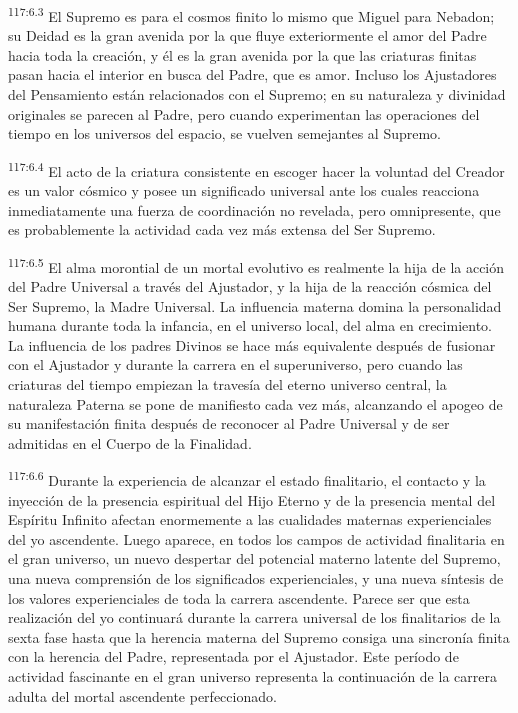 \par
\textsuperscript{117:6.3} El Supremo es para el cosmos finito lo mismo que Miguel para Nebadon; su Deidad es la gran avenida por la que fluye exteriormente el amor del Padre hacia toda la creación, y él es la gran avenida por la que las criaturas finitas pasan hacia el interior en busca del Padre, que es amor. Incluso los Ajustadores del Pensamiento están relacionados con el Supremo; en su naturaleza y divinidad originales se parecen al Padre, pero cuando experimentan las operaciones del tiempo en los universos del espacio, se vuelven semejantes al Supremo.

\par
\textsuperscript{117:6.4} El acto de la criatura consistente en escoger hacer la voluntad del Creador es un valor cósmico y posee un significado universal ante los cuales reacciona inmediatamente una fuerza de coordinación no revelada, pero omnipresente, que es probablemente la actividad cada vez más extensa del Ser Supremo.

\par
\textsuperscript{117:6.5} El alma morontial de un mortal evolutivo es realmente la hija de la acción del Padre Universal a través del Ajustador, y la hija de la reacción cósmica del Ser Supremo, la Madre Universal. La influencia materna domina la personalidad humana durante toda la infancia, en el universo local, del alma en crecimiento. La influencia de los padres Divinos se hace más equivalente después de fusionar con el Ajustador y durante la carrera en el superuniverso, pero cuando las criaturas del tiempo empiezan la travesía del eterno universo central, la naturaleza Paterna se pone de manifiesto cada vez más, alcanzando el apogeo de su manifestación finita después de reconocer al Padre Universal y de ser admitidas en el Cuerpo de la Finalidad.

\par
\textsuperscript{117:6.6} Durante la experiencia de alcanzar el estado finalitario, el contacto y la inyección de la presencia espiritual del Hijo Eterno y de la presencia mental del Espíritu Infinito afectan enormemente a las cualidades maternas experienciales del yo ascendente. Luego aparece, en todos los campos de actividad finalitaria en el gran universo, un nuevo despertar del potencial materno latente del Supremo, una nueva comprensión de los significados experienciales, y una nueva síntesis de los valores experienciales de toda la carrera ascendente. Parece ser que esta realización del yo continuará durante la carrera universal de los finalitarios de la sexta fase hasta que la herencia materna del Supremo consiga una sincronía finita con la herencia del Padre, representada por el Ajustador. Este período de actividad fascinante en el gran universo representa la continuación de la carrera adulta del mortal ascendente perfeccionado.

